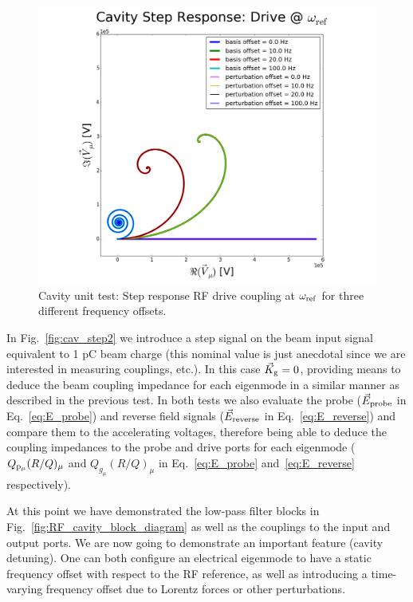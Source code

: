 \documentclass[a4paper,12pt]{article}
\begin{document}
\begin{figure}
\centering
\includegraphics[scale=0.3]{../figures/cavity_test_freqs.png}
\caption{Cavity unit test: Step response RF drive coupling at $\omega_{\rm ref}$ for three different frequency offsets.}
\label{fig:cav_step3}
\end{figure}

In Fig.~\ref{fig:cav_step2} we introduce a step signal on the beam input signal equivalent to 1 pC beam charge (this nominal value is just anecdotal since we are interested in measuring couplings, etc.). In this case $\vec K_{\rm g}=0$, providing means to deduce the beam coupling impedance for each eigenmode in a similar manner as described in the previous test. In both tests we also evaluate the probe ($\vec E_{\rm probe}$ in Eq.~\ref{eq:E_probe}) and reverse field signals ($\vec E_{\rm reverse}$ in Eq.~\ref{eq:E_reverse}) and compare them to the accelerating voltages, therefore being able to deduce the coupling impedances to the probe and drive ports for each eigenmode ($Q_{\rm p_{\mu}}(R/Q)_{\mu}$ and $Q_{g_{\mu}}(R/Q)_\mu$ in Eq.~\ref{eq:E_probe} and~\ref{eq:E_reverse} respectively).


At this point we have demonstrated the low-pass filter blocks in Fig.~\ref{fig:RF_cavity_block_diagram} as well as the couplings to the input and output ports. We are now going to demonstrate an important feature (cavity detuning). One can both configure an electrical eigenmode to have a static frequency offset with respect to the RF reference, as well as introducing a time-varying frequency offset due to Lorentz forces or other perturbations.
\end{document}
